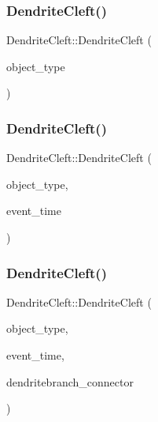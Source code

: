 \subsubsection{\texorpdfstring{Dendrite\+Cleft()}{DendriteCleft()}\hspace{0.1cm}{\footnotesize\ttfamily [2/4]}}
{\footnotesize\ttfamily Dendrite\+Cleft\+::\+Dendrite\+Cleft (\begin{DoxyParamCaption}\item[{unsigned int}]{object\+\_\+type }\end{DoxyParamCaption})\hspace{0.3cm}{\ttfamily [inline]}}

\mbox{\label{classDendriteCleft_ad4070ce743d8302bc120ea948890ea37}} 
\subsubsection{\texorpdfstring{Dendrite\+Cleft()}{DendriteCleft()}\hspace{0.1cm}{\footnotesize\ttfamily [3/4]}}
{\footnotesize\ttfamily Dendrite\+Cleft\+::\+Dendrite\+Cleft (\begin{DoxyParamCaption}\item[{unsigned int}]{object\+\_\+type,  }\item[{std\+::chrono\+::time\+\_\+point$<$ \mbox{\hyperlink{universe_8h_a0ef8d951d1ca5ab3cfaf7ab4c7a6fd80}{Clock}} $>$}]{event\+\_\+time }\end{DoxyParamCaption})\hspace{0.3cm}{\ttfamily [inline]}}

\mbox{\label{classDendriteCleft_abcb81284cd9bd7ee2863eecfb6b59f62}} 
\subsubsection{\texorpdfstring{Dendrite\+Cleft()}{DendriteCleft()}\hspace{0.1cm}{\footnotesize\ttfamily [4/4]}}
{\footnotesize\ttfamily Dendrite\+Cleft\+::\+Dendrite\+Cleft (\begin{DoxyParamCaption}\item[{unsigned int}]{object\+\_\+type,  }\item[{std\+::chrono\+::time\+\_\+point$<$ \mbox{\hyperlink{universe_8h_a0ef8d951d1ca5ab3cfaf7ab4c7a6fd80}{Clock}} $>$}]{event\+\_\+time,  }\item[{\mbox{\hyperlink{classDendriteBranch}{Dendrite\+Branch}} \&}]{dendritebranch\+\_\+connector }\end{DoxyParamCaption})\hspace{0.3cm}{\ttfamily [inline]}}

